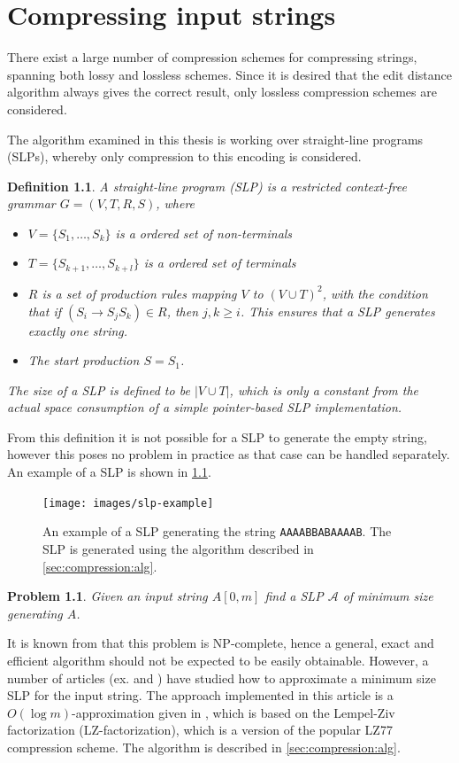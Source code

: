 \documentclass[twoside,11pt,openright]{report}
\newcommand{\str}[3]{#1[#2, #3]}
\newcommand{\SLP}[1] {\mathcal{#1}}
\newtheorem{mydef}{Definition}
\newtheorem{problem}{Problem}
\begin{document}
\chapter{Compressing input strings}
\label{ch:compressing-strings}
There exist a large number of compression schemes for compressing strings, spanning both lossy and lossless schemes. Since it is desired that the edit distance algorithm always gives the correct result, only lossless compression schemes are considered.

The algorithm examined in this thesis is working over straight-line programs (SLPs), whereby only compression to this encoding is considered.
\begin{mydef}
  \label{def:slp}
  A straight-line program (SLP) is a restricted context-free grammar $G = (V, T, R, S)$, where
  \begin{itemize}
    \item $V = \{ S_1, \dots, S_k\}$ is a ordered set of non-terminals
    \item $T = \{ S_{k + 1}, \dots, S_{k + l} \}$ is a ordered set of terminals
    \item $R$ is a set of production rules mapping $V$ to $(V \cup T)^2$, with the condition that if $(S_i \to S_jS_k) \in R$, then $j,k \geq i$. This ensures that a SLP generates exactly one string.
    \item The start production $S = S_1$.
  \end{itemize}
  The size of a SLP is defined to be $|V \cup T|$, which is only a constant from the actual space consumption of a simple pointer-based SLP implementation.
\end{mydef}
From this definition it is not possible for a SLP to generate the empty string, however this poses no problem in practice as that case can be handled separately. An example of a SLP is shown in \cref{fig:slp-example}.
\begin{figure}[!htb]
  \centering
  \texttt{[image: images/slp-example]}
  \caption{An example of a SLP generating the string \texttt{AAAABBABAAAAB}. The SLP is generated using the algorithm described in \cref{sec:compression:alg}.}
  \label{fig:slp-example}
\end{figure}

\begin{problem}
  \label{compression:problem:minimum-slp}
  Given an input string $\str{A}{0}{m}$ find a SLP $\SLP{A}$ of minimum size generating $A$.
\end{problem}
It is known from \cite[p. 212]{Rytter2003211} that this problem is NP-complete, hence a general, exact and efficient algorithm should not be expected to be easily obtainable. However, a number of articles (ex. \cite{Rytter2003211} and \cite{Sakamoto2005416}) have studied how to approximate a minimum size SLP for the input string. The approach implemented in this article is a $O(\log{m})$-approximation given in \cite{Rytter2003211}, which is based on the Lempel-Ziv factorization (LZ-factorization), which is a version of the popular LZ77 compression scheme. The algorithm is described in \cref{sec:compression:alg}.
\end{document}
